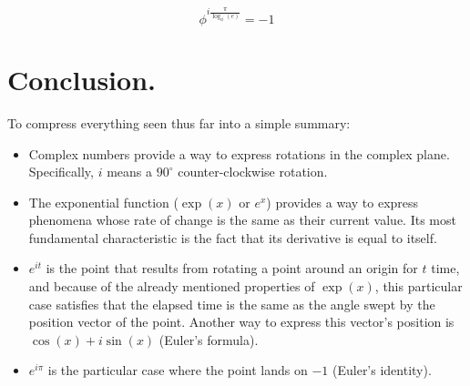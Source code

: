$$\phi^{i\frac{\pi}{\log_{\phi}(e)}} = -1$$

\section{Conclusion.}

To compress everything seen thus far into a simple summary:

\begin{itemize}
	\item Complex numbers provide a way to express rotations in the complex plane. Specifically, $i$ means a $90^{\circ}$ counter-clockwise rotation.
	\item The exponential function ($\exp(x)$ or $e^x$) provides a way to express phenomena whose rate of change is the same as their current value. Its most fundamental characteristic is the fact that its derivative is equal to itself.
	\item $e^{it}$ is the point that results from rotating a point around an origin for $t$ time, and because of the already mentioned properties of $\exp(x)$, this particular case satisfies that the elapsed time is the same as the angle swept by the position vector of the point. Another way to express this vector's position is $\cos(x) + i\sin(x)$ (Euler's formula).
	\item $e^{i\pi}$ is the particular case where the point lands on $-1$ (Euler's identity).
\end{itemize}
